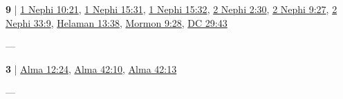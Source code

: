 	\begin{compactdesc}
		\item[day(s) of probation] \textbf{9} | \hyperref[1NEPHI-10-21]{1 Nephi 10:21}, \hyperref[1NEPHI-15-31]{1 Nephi 15:31}, \hyperref[1NEPHI-15-32]{1 Nephi 15:32}, \hyperref[2NEPHI-2-30]{2 Nephi 2:30}, \hyperref[2NEPHI-9-27]{2 Nephi 9:27}, \hyperref[2NEPHI-33-9]{2 Nephi 33:9}, \hyperref[HELAMAN-13-38]{Helaman 13:38}, \hyperref[MORMON-9-28]{Mormon 9:28}, \hyperref[DC29-43]{DC 29:43}
			\begin{compactdesc}
				\item[Bible anchor verses] ---
			\end{compactdesc}
		\item[probationary state] \textbf{3} | \hyperref[ALMA-12-24]{Alma 12:24}, \hyperref[ALMA-42-10]{Alma 42:10}, \hyperref[ALMA-42-13]{Alma 42:13}
			\begin{compactdesc}
				\item[Bible anchor verses] ---
			\end{compactdesc}
	\end{compactdesc}
	


	
